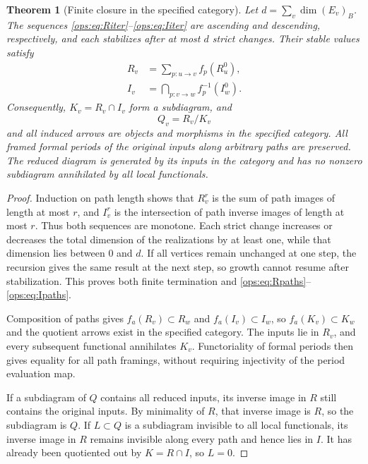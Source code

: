\documentclass[11pt,a4paper,oneside]{article}
\theoremstyle{plain}
\newtheorem{theorem}{Theorem}[section]
\theoremstyle{definition}
\theoremstyle{remark}
\numberwithin{equation}{section}
\begin{document}
\begin{theorem}[Finite closure in the specified category]\label{ops:thm:network}
Let $d=\sum_v\dim(E_v)_B$. The sequences \eqref{ops:eq:Riter}--\eqref{ops:eq:Iiter}
are ascending and descending, respectively, and each stabilizes after at most $d$ strict changes.
Their stable values satisfy
\begin{align}
 R_v&=\sum_{p:u\to v}f_p(R_u^0),\label{ops:eq:Rpaths}\\
 I_v&=\bigcap_{p:v\to w}f_p^{-1}(I_w^0).\label{ops:eq:Ipaths}
\end{align}
Consequently, $K_v=R_v\cap I_v$ form a subdiagram, and
\begin{equation}\label{ops:eq:networkQ}
 Q_v=R_v/K_v
\end{equation}
and all induced arrows are objects and morphisms in the specified category.
All framed formal periods of the original inputs along arbitrary paths are preserved.
The reduced diagram is generated by its inputs in the category and has no nonzero subdiagram annihilated by all local functionals.
\end{theorem}
\begin{proof}
Induction on path length shows that $R_v^r$ is the sum of path images of length at most $r$,
and $I_v^r$ is the intersection of path inverse images of length at most $r$.
Thus both sequences are monotone. Each strict change increases or decreases the total dimension of the realizations by at least one,
while that dimension lies between $0$ and $d$.
If all vertices remain unchanged at one step, the recursion gives the same result at the next step, so growth cannot resume after stabilization.
This proves both finite termination and \eqref{ops:eq:Rpaths}--\eqref{ops:eq:Ipaths}.

Composition of paths gives $f_a(R_v)\subset R_w$ and $f_a(I_v)\subset I_w$,
so $f_a(K_v)\subset K_w$ and the quotient arrows exist in the specified category.
The inputs lie in $R_v$, and every subsequent functional annihilates $K_v$.
Functoriality of formal periods then gives equality for all path framings, without requiring injectivity of the period evaluation map.

If a subdiagram of $Q$ contains all reduced inputs, its inverse image in $R$ still contains the original inputs.
By minimality of $R$, that inverse image is $R$, so the subdiagram is $Q$.
If $L\subset Q$ is a subdiagram invisible to all local functionals, its inverse image in $R$
remains invisible along every path and hence lies in $I$. It has already been quotiented out by $K=R\cap I$, so $L=0$.
\end{proof}
\end{document}
